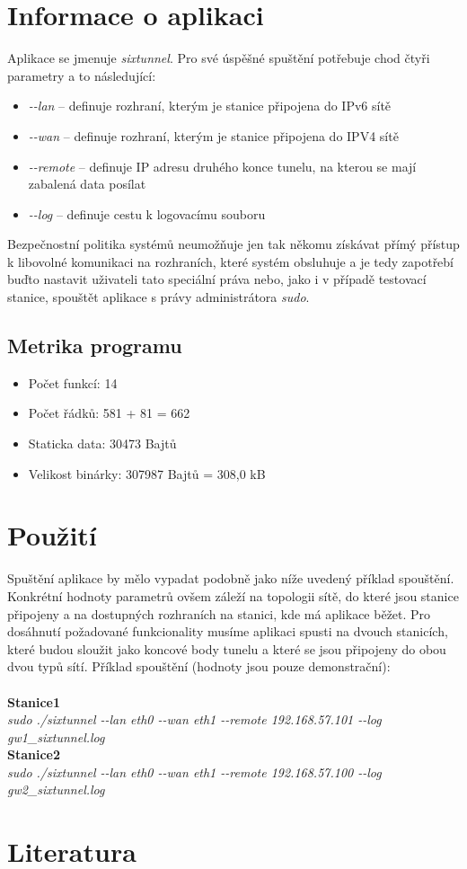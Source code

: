 \documentclass[12pt,a4paper,onecolumn]{article}
\begin{document}
\section{Informace o aplikaci}
Aplikace se jmenuje {\it sixtunnel}. Pro své úspěšné spuštění potřebuje chod čtyři parametry a
to následující:
\begin{itemize}
    \item {\it \--\--lan} -- definuje rozhraní, kterým je stanice připojena do IPv6 sítě
    \item {\it \--\--wan} -- definuje rozhraní, kterým je stanice připojena do IPV4 sítě
    \item {\it \--\--remote} -- definuje IP adresu druhého konce tunelu, na kterou se mají
        zabalená data posílat
    \item {\it \--\--log} -- definuje cestu k logovacímu souboru
\end{itemize}
\indent Bezpečnostní politika systémů neumožňuje jen tak někomu získávat přímý přístup k libovolné
komunikaci na rozhraních, které systém obsluhuje a je tedy zapotřebí buďto nastavit uživateli tato
speciální práva nebo, jako i v případě testovací stanice, spouštět aplikace s právy administrátora
{\it sudo}.

\subsection{Metrika programu}
\begin{itemize}
    \item Počet funkcí: 14
    \item Počet řádků: 581 + 81 = 662
    \item Staticka data: 30473 Bajtů 
    \item Velikost binárky: 307987 Bajtů = 308,0 kB
\end{itemize}

\section{Použití}
Spuštění aplikace by mělo vypadat podobně jako níže uvedený příklad spouštění. Konkrétní hodnoty
parametrů ovšem záleží na topologii sítě, do které jsou stanice připojeny a na dostupných
rozhraních na stanici, kde má aplikace běžet.
\indent Pro dosáhnutí požadované funkcionality musíme aplikaci spusti na dvouch stanicích,
které budou sloužit jako koncové body tunelu a které se jsou připojeny do obou dvou typů
sítí. Příklad spouštění (hodnoty jsou pouze demonstrační):\\ \\
\textbf{Stanice1} \\
{\it sudo ./sixtunnel \--\--lan eth0 \--\--wan eth1 \--\--remote 192.168.57.101 \--\--log gw1\_sixtunnel.log}\\
\textbf{Stanice2} \\
{\it sudo ./sixtunnel \--\--lan eth0 \--\--wan eth1 \--\--remote 192.168.57.100 \--\--log gw2\_sixtunnel.log}


\section{Literatura}
\end{document}

